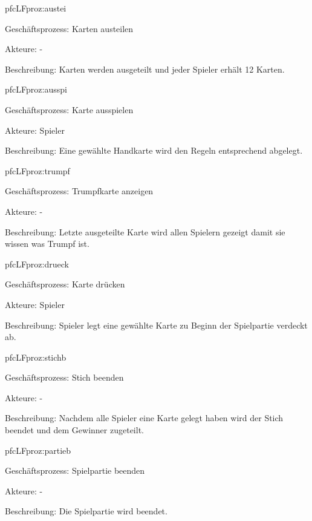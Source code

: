 \begin{description}[leftmargin=5em, style=sameline]
	\begin{lhp}{pfc}{LF}{proz:austei}
		\item [Geschäftsprozess:] Karten austeilen
		\item [Akteure:] -
		\item [Beschreibung:] Karten werden ausgeteilt und jeder Spieler erhält 12 Karten.
	\end{lhp}

	\begin{lhp}{pfc}{LF}{proz:ausspi}
		\item [Geschäftsprozess:] Karte ausspielen
		\item [Akteure:] Spieler
		\item [Beschreibung:] Eine gewählte Handkarte wird den Regeln entsprechend abgelegt.
	\end{lhp}

	\begin{lhp}{pfc}{LF}{proz:trumpf}
		\item [Geschäftsprozess:] Trumpfkarte anzeigen
		\item [Akteure:] -
		\item [Beschreibung:] Letzte ausgeteilte Karte wird allen Spielern gezeigt damit sie wissen was Trumpf ist.
	\end{lhp}
	
	\begin{lhp}{pfc}{LF}{proz:drueck}
		\item [Geschäftsprozess:] Karte drücken
		\item [Akteure:] Spieler
		\item [Beschreibung:] Spieler legt eine gewählte Karte zu Beginn der Spielpartie verdeckt ab.
	\end{lhp}						

	\begin{lhp}{pfc}{LF}{proz:stichb}
		\item [Geschäftsprozess:] Stich beenden
		\item [Akteure:] -
		\item [Beschreibung:] Nachdem alle Spieler eine Karte gelegt haben wird der Stich beendet und dem Gewinner zugeteilt.
	\end{lhp}
	
	\begin{lhp}{pfc}{LF}{proz:partieb}
		\item [Geschäftsprozess:] Spielpartie beenden
		\item [Akteure:] -
		\item [Beschreibung:] Die Spielpartie wird beendet.
	\end{lhp}


\end{description}
